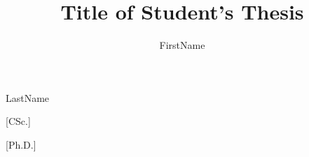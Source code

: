 
\usepackage[
  english,			%
	semestral,		%
  center,			%
]{thesis}   %


\author[Bc.]{FirstName}{LastName}


[CSc.]

[Ph.D.]

\title{Title of Student's Thesis}

